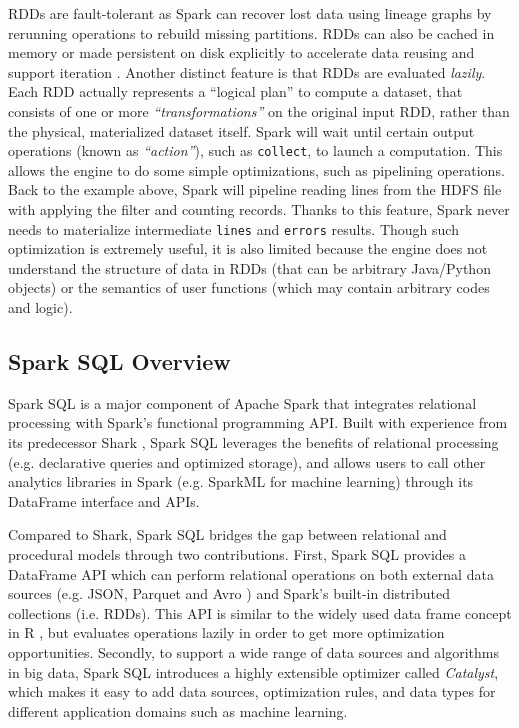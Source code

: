 RDDs are fault-tolerant as Spark can recover lost data using lineage
graphs by rerunning operations to rebuild missing partitions. RDDs can
also be cached in memory or made persistent on disk explicitly to
accelerate data reusing and support iteration \cite{spark}. Another
distinct feature is that RDDs are evaluated \emph{lazily}. Each RDD
actually represents a ``logical plan'' to compute a dataset, that
consists of one or more {\em ``transformations''} on the original
input RDD, rather than the physical, materialized dataset
itself. Spark will wait until certain output operations (known as {\em
  ``action''}), such as \texttt{collect}, to launch a
computation. This allows the engine to do some simple optimizations,
such as pipelining operations. Back to the example above, Spark will
pipeline reading lines from the HDFS file with applying the filter and
counting records. Thanks to this feature, Spark never needs to
materialize intermediate \texttt{lines} and \texttt{errors}
results. Though such optimization is extremely useful, it is also
limited because the engine does not understand the structure of data
in RDDs (that can be arbitrary Java/Python objects) or the semantics
of user functions (which may contain arbitrary codes and logic).

\subsection{Spark SQL Overview}
\label{sub:sparksql}
Spark SQL \cite{sparksql} is a major component of Apache Spark that
integrates relational processing with Spark's functional programming
API. Built with experience from its predecessor Shark \cite{shark},
Spark SQL leverages the benefits of relational processing
(e.g. declarative queries and optimized storage), and allows users to
call other analytics libraries in Spark (e.g. SparkML for machine
learning) through its DataFrame interface and APIs.

Compared to Shark, Spark SQL bridges the gap between relational and
procedural models through two contributions. First, Spark SQL provides
a DataFrame API which can perform relational operations on both
external data sources (e.g. JSON, Parquet \cite{parquet} and Avro
\cite{avro}) and Spark's built-in distributed collections
(i.e. RDDs). This API is similar to the widely used data frame concept
in R \cite{sysr}, but evaluates operations lazily in order to get more
optimization opportunities.  Secondly, to support a wide range of data
sources and algorithms in big data, Spark SQL introduces a highly
extensible optimizer called \emph{Catalyst}, which makes it easy to
add data sources, optimization rules, and data types for different
application domains such as machine learning.

